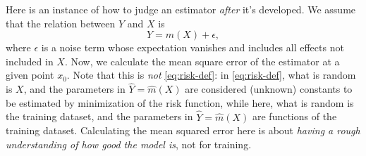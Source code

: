 \documentclass[hyperref, a4paper]{article}
\begin{document}
Here is an instance of how to judge an estimator \emph{after} it's developed.
We assume that the relation between $Y$ and $X$ is 
\begin{equation}
    Y = m(X) + \epsilon,
\end{equation}
where $\epsilon$ is a noise term whose expectation vanishes 
and includes all effects not included in $X$.
Now, we calculate the mean square error of the estimator at a given point $x_0$.
Note that this is \emph{not} \eqref{eq:risk-def}:
in \eqref{eq:risk-def}, what is random is $X$,
and the parameters in $\hat{Y} = \hat{m}(X)$ are considered (unknown) constants
to be estimated by minimization of the risk function,
while here, what is random is the training dataset,
and the parameters in $\hat{Y} = \hat{m}(X)$ are functions of the training dataset.
Calculating the mean squared error here is about \emph{having a rough understanding of how good the model is}, not for training.
\end{document}
